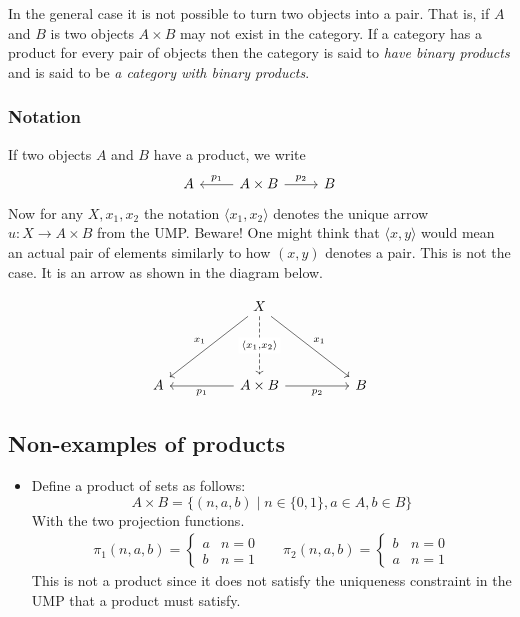 \documentclass{book}
\theoremstyle{definition}
\begin{document}
In the general case it is not possible to turn two objects into a pair. That is,
if $A$ and $B$ is two objects $A \times B$ may not exist in the category. If a
category has a product for every pair of objects then the category is said to
\emph{have binary products} and is said to be \emph{a category with binary
  products}.

\subsubsection{Notation}

If two objects $A$ and $B$ have a product, we write
\[
  \begin{tikzcd}
    A & A \times B \arrow[l, "p_1"'] \arrow[r, "p_2"] & B
  \end{tikzcd}
\]
Now for any $X, x_{1}, x_{2}$ the notation $\langle x_1, x_2 \rangle$ denotes the unique
arrow $u : X \to A \times B$ from the UMP. Beware! One might think that
$\langle x, y \rangle$ would mean an actual pair of elements similarly to how
$(x, y)$ denotes a pair. This is not the case. It is an arrow as shown in the
diagram below.

\[
  \begin{tikzcd}[row sep = 4.2em, column sep = 4.6em]
    & X \arrow[ld, "x_1"'] \arrow[d, dashrightarrow, "{\langle x_1, x_2 \rangle}" description] \arrow[rd, "x_1"] \\
    A & A \times B \arrow[l, "p_1"] \arrow[r, "p_2"'] & B
  \end{tikzcd}
\]

\subsection{Non-examples of products}

\begin{itemize}
\item Define a product of sets as follows:
  \[ A \times B = \{ (n, a, b) \mid n \in \{ 0, 1 \}, a \in A, b \in B \}\]
  With the two projection functions.
  \begin{align*}
    \pi_1(n, a, b) = \begin{cases} a & n = 0 \\ b & n = 1 \end{cases} &&
    \pi_2(n, a, b) = \begin{cases} b & n = 0 \\ a & n = 1 \end{cases}
  \end{align*}
  This is not a product since it does not satisfy the uniqueness constraint in
  the UMP that a product must satisfy.
\end{itemize}
\end{document}

